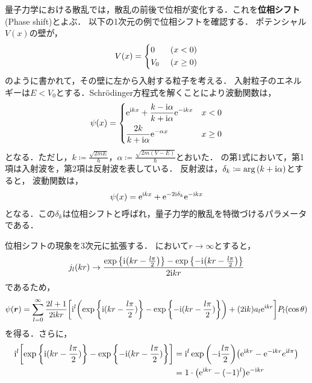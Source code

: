 \documentclass{report}
\begin{document}
  量子力学における散乱では，散乱の前後で位相が変化する．これを\textbf{位相シフト}(Phase shift)とよぶ．
  以下の1次元の例で位相シフトを確認する．
  ポテンシャル$V(x)$の壁が，
  \begin{align}
    V(x) = 
    \begin{dcases}
      0\ &(x < 0) \\
      V_0\ &(x \geq 0)
    \end{dcases}
  \end{align}
  のように書かれて，その壁に左から入射する粒子を考える．
  入射粒子のエネルギーは$E<V_0$とする．Schrödinger方程式を解くことにより波動関数は，
  \begin{align}
    \psi(x) = 
    \begin{dcases}
      \mathrm{e}^{\mathrm{i} kx} + \frac{k -\mathrm{i}\alpha}{k + \mathrm{i}\alpha} \mathrm{e}^{-\mathrm{i} kx} & x < 0 \label{1Dscattering} \\
      \frac{2k}{k + \mathrm{i}\alpha}\mathrm{e}^{-\alpha x} & x \geq 0
    \end{dcases}
  \end{align}
  となる．ただし，$k \coloneqq \frac{\sqrt{2mE}}{\hbar}$，$\alpha \coloneqq \frac{\sqrt{2m(V - E)}}{\hbar}$とおいた．
  の第1式において，第1項は入射波を，第2項は反射波を表している．
  反射波は，$\delta_k \coloneqq \arg\qty(k + \mathrm{i}\alpha)$とすると，
  波動関数は，
  \begin{align}
    \psi(x) = \mathrm{e}^{\mathrm{i} kx} + \mathrm{e}^{-2 \mathrm{i} \delta_k}\mathrm{e}^{-\mathrm{i} kx}
  \end{align}
  となる．この$\delta_k$は位相シフトと呼ばれ，量子力学的散乱を特徴づけるパラメータである．
  \par
  位相シフトの現象を3次元に拡張する．
  において$r\to\infty$とすると，
  \begin{align}
    j_l(kr) \to \frac{\exp\qty{\mathrm{i}\qty(kr - \frac{l\pi}{2})} - \exp\qty{-\mathrm{i}\qty(kr - \frac{l\pi}{2})}}{2\mathrm{i} kr}
  \end{align}
  であるため，
  \begin{align}
    \psi(\bm{r}) = \sum_{l = 0}^{\infty} \frac{2l + 1}{2\mathrm{i} kr}\qty[\mathrm{i}^l \qty(\exp\qty{\mathrm{i}(kr - \frac{l\pi}{2})} - \exp\qty{-\mathrm{i}(kr - \frac{l\pi}{2})}) + (2\mathrm{i} k) a_l \mathrm{e}^{\mathrm{i} kr}]P_l(\cos\theta)
  \end{align}
  を得る．さらに，
  \begin{align}
    \mathrm{i}^l \qty[\exp\qty{\mathrm{i}(kr - \frac{l\pi}{2})} - \exp\qty{-\mathrm{i}(kr - \frac{l\pi}{2})}] &= \mathrm{i}^l \exp\qty(-\mathrm{i}\frac{l\pi}{2})\qty(\mathrm{e}^{\mathrm{i} kr} - \mathrm{e}^{-\mathrm{i} kr} e^{\mathrm{i} l\pi}) \\
    &= 1\cdot\qty(\mathrm{e}^{\mathrm{i} kr} - (-1)^l) \mathrm{e}^{-\mathrm{i} kr}
  \end{align}
\end{document}
